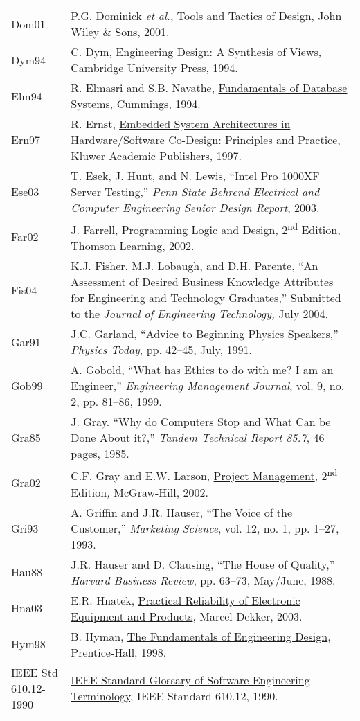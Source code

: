 \begin{longtable}[]{@{}
  >{\raggedright\arraybackslash}p{}
  >{\raggedright\arraybackslash}p{}@{}}
Dom01 & P.G. Dominick \emph{et al.}, \ul{Tools and Tactics of Design},
John Wiley \& Sons, 2001. \\
Dym94 & C. Dym, \ul{Engineering Design: A Synthesis of Views}, Cambridge
University Press, 1994. \\
Elm94 & R. Elmasri and S.B. Navathe, \ul{Fundamentals of Database
Systems}, Cummings, 1994. \\
Ern97 & R. Ernst, \ul{Embedded System Architectures in Hardware/Software
Co-Design: Principles and Practice}, Kluwer Academic Publishers,
1997. \\
Ese03 & T. Esek, J. Hunt, and N. Lewis, ``Intel Pro 1000XF Server
Testing,'' \emph{Penn State Behrend Electrical and Computer Engineering
Senior Design Report}, 2003. \\
Far02 & J. Farrell, \ul{Programming Logic and Design,}
2\textsuperscript{nd} Edition, Thomson Learning, 2002. \\
Fis04 & K.J. Fisher, M.J. Lobaugh, and D.H. Parente, ``An Assessment of
Desired Business Knowledge Attributes for Engineering and Technology
Graduates,'' Submitted to the \emph{Journal of Engineering Technology,}
July 2004. \\
Gar91 & J.C. Garland, ``Advice to Beginning Physics Speakers,''
\emph{Physics Today}, pp. 42--45, July, 1991. \\
Gob99 & A. Gobold, ``What has Ethics to do with me? I am an Engineer,''
\emph{Engineering Management Journal}, vol. 9, no. 2, pp. 81--86,
1999. \\
Gra85 & J. Gray. ``Why do Computers Stop and What Can be Done About
it?,'' \emph{Tandem Technical Report 85.7}, 46 pages, 1985. \\
Gra02 & C.F. Gray and E.W. Larson, \ul{Project Management},
2\textsuperscript{nd} Edition\emph{,} McGraw-Hill, 2002. \\
Gri93 & A. Griffin and J.R. Hauser, ``The Voice of the Customer,''
\emph{Marketing Science}, vol. 12, no. 1, pp. 1--27, 1993. \\
Hau88 & J.R. Hauser and D. Clausing, ``The House of Quality,''
\emph{Harvard Business Review}, pp. 63--73, May/June, 1988. \\
Hna03 & E.R. Hnatek, \ul{Practical Reliability of Electronic Equipment
and Products}, Marcel Dekker, 2003. \\
Hym98 & B. Hyman, \ul{The Fundamentals of Engineering Design},
Prentice-Hall, 1998. \\
IEEE Std 610.12-1990 & \ul{IEEE Standard Glossary of Software
Engineering Terminology}, IEEE Standard 610.12, 1990. \\

\end{longtable}
